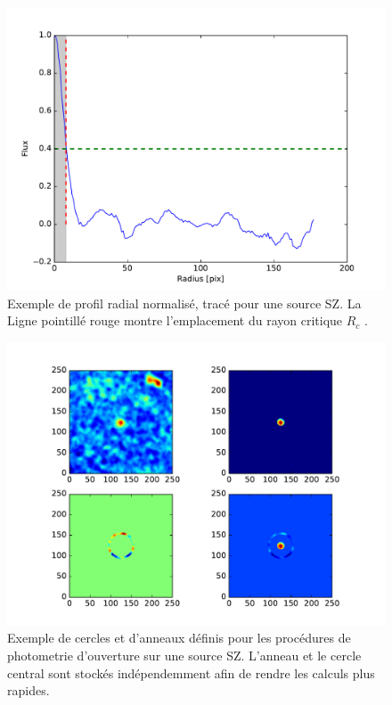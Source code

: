 \documentclass[a4paper,11pt]{article}
\begin{document}
\begin{figure}[h!]
  \centering
  \label{profile radial}
  \includegraphics[scale = 0.5]{profile_radiale_ama.pdf}
  \caption{Exemple de profil radial normalisé, tracé pour une source SZ. La Ligne pointillé rouge montre 
  l'emplacement du rayon critique $R_c$ .}
\end{figure}


\begin{figure}[h!]
  \centering
  \label{photometrie d'ouverture}
  \includegraphics[scale = 0.8]{exemple_photometrie_d'ouverture.pdf}
  \caption{Exemple de cercles et d'anneaux définis pour les procédures de photometrie d'ouverture sur une source SZ. 
  L'anneau et le cercle central sont stockés indépendemment afin de rendre les calculs plus rapides.}
\end{figure}
\end{document}

